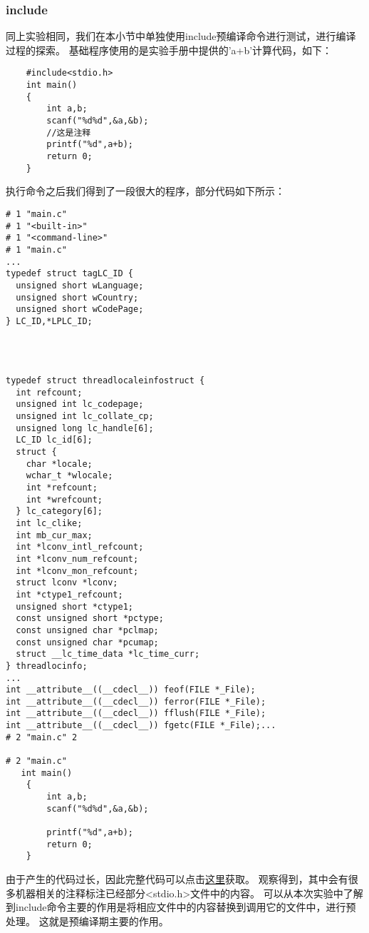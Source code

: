 \documentclass[UTF8]{ctexart}
\begin{document}
\subsubsection{include}
\label{注释}
同上实验相同，我们在本小节中单独使用include预编译命令进行测试，进行编译过程的探索。
基础程序使用的是实验手册中提供的'a+b'计算代码，如下：
\begin{lstlisting}
    #include<stdio.h>
    int main()
    {
        int a,b;
        scanf("%d%d",&a,&b);
        //这是注释
        printf("%d",a+b);
        return 0;
    }
\end{lstlisting}
执行命令之后我们得到了一段很大的程序，部分代码如下所示：
\begin{lstlisting}
# 1 "main.c"
# 1 "<built-in>"
# 1 "<command-line>"
# 1 "main.c"
...
typedef struct tagLC_ID {
  unsigned short wLanguage;
  unsigned short wCountry;
  unsigned short wCodePage;
} LC_ID,*LPLC_ID;




typedef struct threadlocaleinfostruct {
  int refcount;
  unsigned int lc_codepage;
  unsigned int lc_collate_cp;
  unsigned long lc_handle[6];
  LC_ID lc_id[6];
  struct {
    char *locale;
    wchar_t *wlocale;
    int *refcount;
    int *wrefcount;
  } lc_category[6];
  int lc_clike;
  int mb_cur_max;
  int *lconv_intl_refcount;
  int *lconv_num_refcount;
  int *lconv_mon_refcount;
  struct lconv *lconv;
  int *ctype1_refcount;
  unsigned short *ctype1;
  const unsigned short *pctype;
  const unsigned char *pclmap;
  const unsigned char *pcumap;
  struct __lc_time_data *lc_time_curr;
} threadlocinfo;
...
int __attribute__((__cdecl__)) feof(FILE *_File);
int __attribute__((__cdecl__)) ferror(FILE *_File);
int __attribute__((__cdecl__)) fflush(FILE *_File);
int __attribute__((__cdecl__)) fgetc(FILE *_File);...
# 2 "main.c" 2
    
# 2 "main.c"
   int main()
    {
        int a,b;
        scanf("%d%d",&a,&b);

        printf("%d",a+b);
        return 0;
    }
\end{lstlisting}
由于产生的代码过长，因此完整代码可以点击\href{https://paste.ubuntu.com/p/F7ZSb8bvyh/}{这里}获取。
观察得到，其中会有很多机器相关的注释标注已经部分<stdio.h>文件中的内容。
可以从本次实验中了解到include命令主要的作用是将相应文件中的内容替换到调用它的文件中，进行预处理。
这就是预编译期主要的作用。
\end{document}
